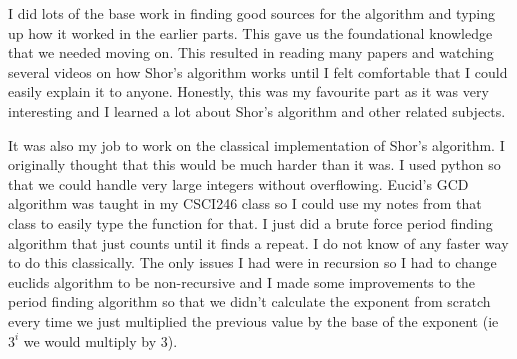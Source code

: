 \documentclass[a4paper]{article}
\begin{document}
I did lots of the base work in finding good sources for the algorithm and typing up how it worked in the earlier parts. This gave us the foundational knowledge that we needed moving on. This resulted in reading many papers and watching several videos on how Shor's algorithm works until I felt comfortable that I could easily explain it to anyone. Honestly, this was my favourite part as it was very interesting and I learned a lot about Shor's algorithm and other related subjects. 

It was also my job to work on the classical implementation of Shor's algorithm. I originally thought that this would be much harder than it was. I used python so that we could handle very large integers without overflowing. Eucid's GCD algorithm was taught in my CSCI246 class so I could use my notes from that class to easily type the function for that. I just did a brute force  period finding algorithm that just counts until it finds a repeat. I do not know of any faster way to do this classically. The only issues I had were in recursion so I had to change euclids algorithm to be non-recursive and I made some improvements to the period finding algorithm so that we didn't calculate the exponent from scratch every time we just multiplied the previous value by the base of the exponent (ie $3^i$ we would multiply by 3).
\end{document}
